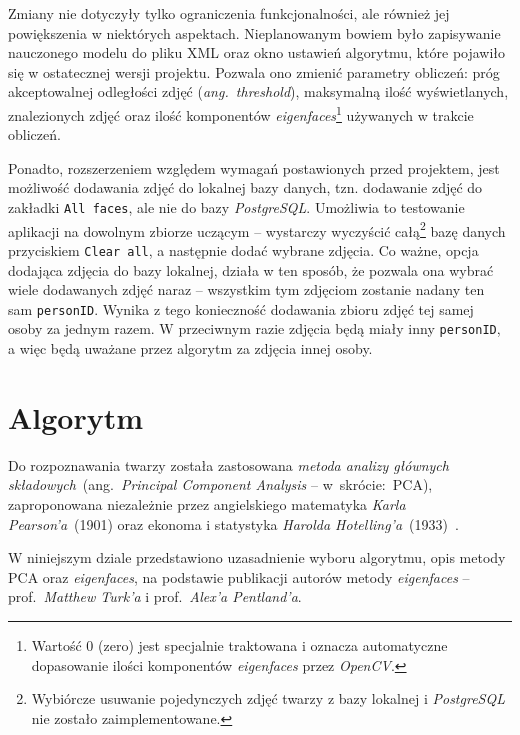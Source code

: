 \documentclass[a4paper,titlepage]{article}
\theoremstyle{break}
\numberwithin{equation}{subsection}
\begin{document}
Zmiany nie dotyczyły tylko ograniczenia funkcjonalności, ale również jej powiększenia w niektórych aspektach. Nieplanowanym bowiem było zapisywanie nauczonego modelu do pliku XML oraz okno ustawień algorytmu, które pojawiło się w ostatecznej wersji projektu. Pozwala ono zmienić parametry obliczeń: próg akceptowalnej odległości zdjęć (\emph{ang.~threshold}), maksymalną ilość wyświetlanych, znalezionych zdjęć oraz ilość komponentów \emph{eigenfaces}\footnote{Wartość 0 (zero) jest specjalnie traktowana i oznacza automatyczne dopasowanie ilości komponentów \emph{eigenfaces} przez \emph{OpenCV}.} używanych w trakcie obliczeń.

Ponadto, rozszerzeniem względem wymagań postawionych przed projektem, jest możliwość dodawania zdjęć do lokalnej bazy danych, tzn. dodawanie zdjęć do zakładki \texttt{All~faces}, ale nie do bazy \emph{PostgreSQL}. Umożliwia to testowanie aplikacji na dowolnym zbiorze uczącym -- wystarczy wyczyścić całą\footnote{Wybiórcze usuwanie pojedynczych zdjęć twarzy z bazy lokalnej i \emph{PostgreSQL} nie zostało zaimplementowane.} bazę danych przyciskiem \texttt{Clear all}, a następnie dodać wybrane zdjęcia. Co ważne, opcja dodająca zdjęcia do bazy lokalnej, działa w ten sposób, że pozwala ona wybrać wiele dodawanych zdjęć naraz -- wszystkim tym zdjęciom zostanie nadany ten sam \texttt{personID}. Wynika z tego konieczność dodawania zbioru zdjęć tej samej osoby za jednym razem. W przeciwnym razie zdjęcia będą miały inny \texttt{personID}, a więc będą uważane przez algorytm za zdjęcia innej osoby.


\section{Algorytm}
\label{sec:algorytm}

Do rozpoznawania twarzy została zastosowana \emph{metoda analizy głównych składowych}~(ang.~\emph{Principal Component Analysis} -- w~skrócie:~PCA), zaproponowana niezależnie przez angielskiego matematyka \emph{Karla Pearson'a}~(1901) oraz ekonoma i statystyka \emph{Harolda Hotelling'a}~(1933)~\cite{pearson}.

W niniejszym dziale przedstawiono uzasadnienie wyboru algorytmu, opis metody PCA oraz \emph{eigenfaces}, na podstawie publikacji autorów metody \emph{eigenfaces} -- prof.~\emph{Matthew Turk'a} i prof.~\emph{Alex'a Pentland'a}\cite{turk}.
\end{document}
